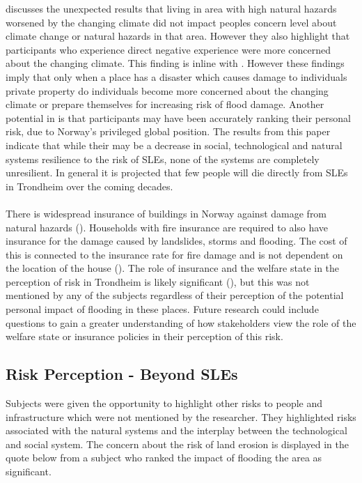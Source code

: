 \cite{lujala_climate_2015} discusses the unexpected results that living in area with high natural hazards worsened by the changing climate did not impact peoples concern level about climate change or natural hazards in that area. However they also highlight that participants who experience direct negative experience were more concerned about the changing climate. This finding is inline with \cite{whitmarsh_are_2008}. However these findings imply that only when a place has a disaster which causes damage to individuals private property do individuals become more concerned about the changing climate or prepare themselves for increasing risk of flood damage. Another potential in \cite{lujala_climate_2015} is that participants may have been accurately ranking their personal risk, due to Norway's privileged global position. The results from this paper indicate that while their may be a decrease in social, technological and natural systems resilience to the risk of SLEs, none of the systems are completely unresilient. In general it is projected that few people will die directly from SLEs in Trondheim over the coming decades.
\paragraph{}


There is widespread insurance of buildings in Norway against damage from natural hazards (\cite{lujala_role_2020}). Households with fire insurance are required to also have insurance for the damage caused by landslides, storms and flooding. The cost of this is connected to the insurance rate for fire damage and is not dependent on the location of the house (\cite{lujala_role_2020}). The role of insurance and the welfare state in the perception of risk in Trondheim is likely significant (\cite{lujala_role_2020}), but this was not mentioned by any of the subjects regardless of their perception of the potential personal impact of flooding in these places. Future research could include questions to gain a greater understanding of how stakeholders view the role of the welfare state or insurance policies in their perception of this risk. 

\subsection{Risk Perception - Beyond SLEs}
Subjects were given the opportunity to highlight other risks to people and infrastructure which were not mentioned by the researcher. They highlighted risks associated with the natural systems and the interplay between the technological and social system. The concern about the risk of land erosion is displayed in the quote below from a subject who ranked the impact of flooding the area as significant.

